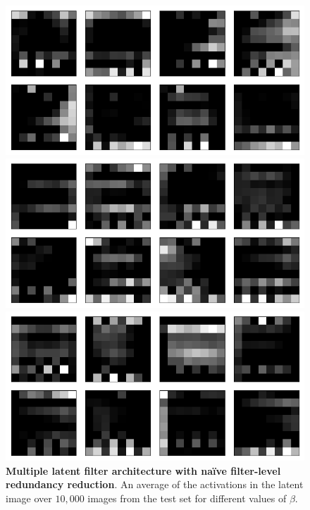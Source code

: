 \begin{figure}[h!]
\centering
\captionsetup{justification=centering}

    \includegraphics[scale=0.3]{figures/results/naive_average/beta_1_average_activation.png}
    \caption{$\beta=1$}
    \includegraphics[scale=0.3]{figures/results/naive_average/beta_4_average_activation.png}
    \caption{$\beta=4$}
    \includegraphics[scale=0.42]{figures/results/naive_average/beta_32_average_activation.png}
    \caption{$\beta=32$}

\caption{\textbf{Multiple latent filter architecture with na{\"i}ve filter-level redundancy reduction}. An average of the activations in the latent image over $10,000$ images from the test set for different values of $\beta$.}
\label{fig:naive_average_average_filters}
\end{figure}




